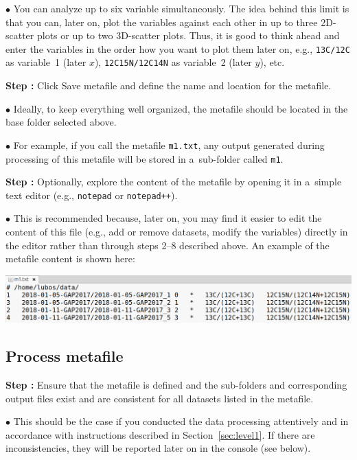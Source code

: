 \documentclass[a4paper, 11pt]{article}
\newcommand{\ttt}[1]{\texttt{#1}}
\newcommand{\lans}[1]{{\color{magenta}#1}}
\newcommand{\lanstf}[1]{{\color{cyan}#1}}
\newcounter{step}
\newcommand\s{\addtocounter{step}{1}\vskip5pt\noindent\textbf{Step \thestep:}{ }}
\newcommand\bul{\vskip5pt\noindent$\bullet${ }}
\begin{document}
\bul You can analyze up to six variable simultaneously. The idea behind this limit is that you can, later on, plot the variables against each other in up to three 2D-scatter plots or up to two 3D-scatter plots. Thus, it is good to think ahead and enter the variables in the order how you want to plot them later on, e.g., \ttt{13C/12C} as variable~1 (later $x$), \ttt{12C15N/12C14N} as variable~2 (later $y$), etc.

\s Click \lans{Save metafile} and define the name and location for the metafile.

\bul Ideally, to keep everything well organized, the metafile should be located in the \lanstf{base folder} selected above. 

\bul For example, if you call the metafile \ttt{m1.txt}, any output generated during processing of this metafile will be stored in a~sub-folder called \ttt{m1}.

\s Optionally, explore the content of the metafile by opening it in a~simple text editor (e.g., \ttt{notepad} or \ttt{notepad++}).

\bul This is recommended because, later on, you may find it easier to edit the content of this file (e.g., add or remove datasets, modify the variables) directly in the editor rather than through steps 2--8 described above. An example of the metafile content is shown here:
\begin{center}
\includegraphics[scale=0.35]{figs3/LANS-metafile-m1}
\end{center}


\subsection{Process metafile}
\setcounter{step}{0}

\s Ensure that the metafile is defined and the sub-folders and corresponding output files exist and are consistent for all datasets listed in the metafile.

\bul This should be the case if you conducted the data processing attentively and in accordance with instructions described in Section~\ref{sec:level1}. If there are inconsistencies, they will be reported later on in the console (see below).
\end{document}
